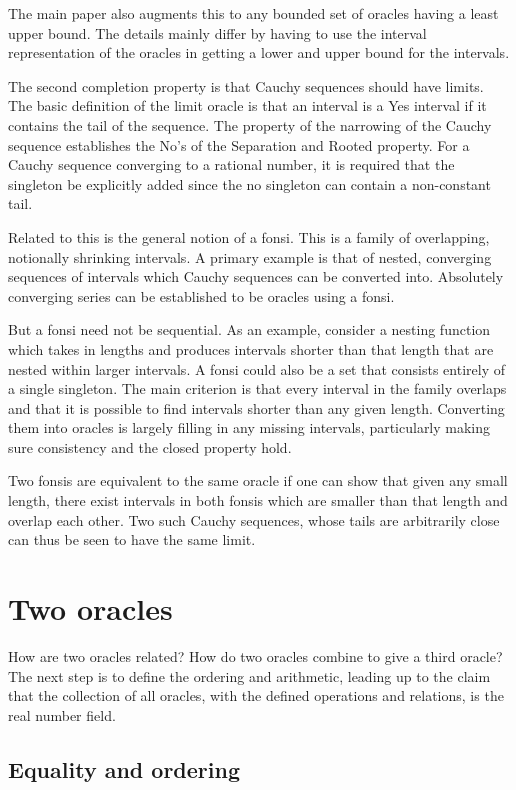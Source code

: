 \documentclass[12pt]{article}
\theoremstyle{remark}
\begin{document}
The main paper also augments this to any bounded set of oracles having a least upper bound. The details mainly differ by having to use the interval representation of the oracles in getting a lower and upper bound for the intervals. 

The second completion property is that Cauchy sequences should have limits. The basic definition of the limit oracle is that an interval is a Yes interval if it contains the tail of the sequence. The property of the narrowing of the Cauchy sequence establishes the No's of the Separation and Rooted property. For a Cauchy sequence converging to a rational number, it is required that the singleton be explicitly added since the no singleton can contain a non-constant tail.

Related to this is the general notion of a fonsi. This is a family of overlapping, notionally shrinking intervals. A primary example is that of nested, converging sequences of intervals which Cauchy sequences can be converted into. Absolutely converging series can be established to be oracles using a fonsi. 

But a fonsi need not be sequential. As an example, consider a nesting function which takes in lengths and produces intervals shorter than that length that are nested within larger intervals. A fonsi could also be a set that consists entirely of a single singleton. The main criterion is that every interval in the family overlaps and that it is possible to find intervals shorter than any given length. Converting them into oracles is largely filling in any missing intervals, particularly making sure consistency and the closed property hold.  

Two fonsis are equivalent to the same oracle if one can show that given any small length, there exist intervals in both fonsis which are smaller than that length and overlap each other. Two such Cauchy sequences, whose tails are arbitrarily close can thus be seen to have the same limit. 

\section{Two oracles}

How are two oracles related? How do two oracles combine to give a third oracle?  The next step is to define the ordering and arithmetic, leading up to the claim that the collection of all oracles, with the defined operations and relations, is the real number field. 

\subsection{Equality and ordering}
\end{document}
